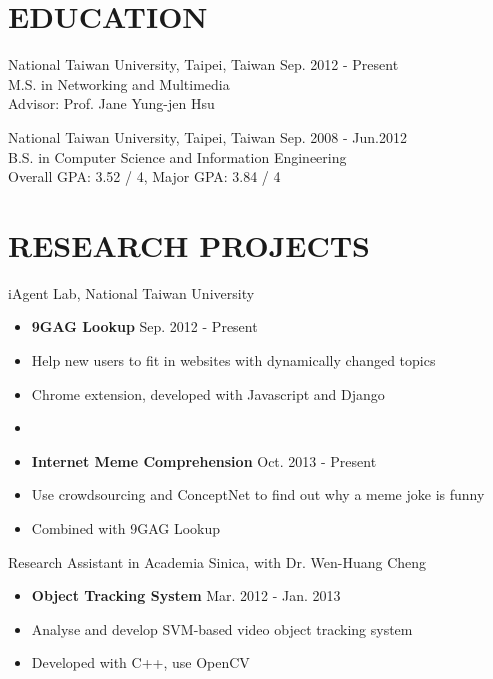 \documentclass[margin]{main}
\begin{document}
 
 

\address{
    4F., No.10, Aly. 4, Ln. 201, Yucheng St., \\
    Nangang Dist., Taipei City 115, \\
    Taiwan (R.O.C)
}

\address{
    \hfill +886-923-869-910 \\
    \hfill john.lin.chichin@gmail.com \\
    \hfill https://github.com/averangeall
}

\begin{resume}
 
\section{EDUCATION}
National Taiwan University, Taipei, Taiwan \hfill Sep. 2012 - Present \\
M.S. in Networking and Multimedia \\
Advisor: Prof. Jane Yung-jen Hsu
 
National Taiwan University, Taipei, Taiwan \hfill Sep. 2008 - Jun.2012 \\
B.S. in Computer Science and Information Engineering \\
Overall GPA: 3.52 / 4, Major GPA: 3.84 / 4

\section{RESEARCH PROJECTS}
iAgent Lab, National Taiwan University
\begin{itemize} \itemsep -2pt
    \item[] {\bf 9GAG Lookup} \hfill Sep. 2012 - Present
    \item[] Help new users to fit in websites with dynamically changed topics
    \item[] Chrome extension, developed with Javascript and Django
    \item[]
    \item[] {\bf Internet Meme Comprehension} \hfill Oct. 2013 - Present
    \item[] Use crowdsourcing and ConceptNet to find out why a meme joke is funny
    \item[] Combined with 9GAG Lookup
\end{itemize}

Research Assistant in Academia Sinica, with Dr. Wen-Huang Cheng
\begin{itemize} \itemsep -2pt
    \item[] {\bf Object Tracking System} \hfill Mar. 2012 - Jan. 2013
    \item[] Analyse and develop SVM-based video object tracking system
    \item[] Developed with C++, use OpenCV
\end{itemize}


\end{resume}
\end{document}
